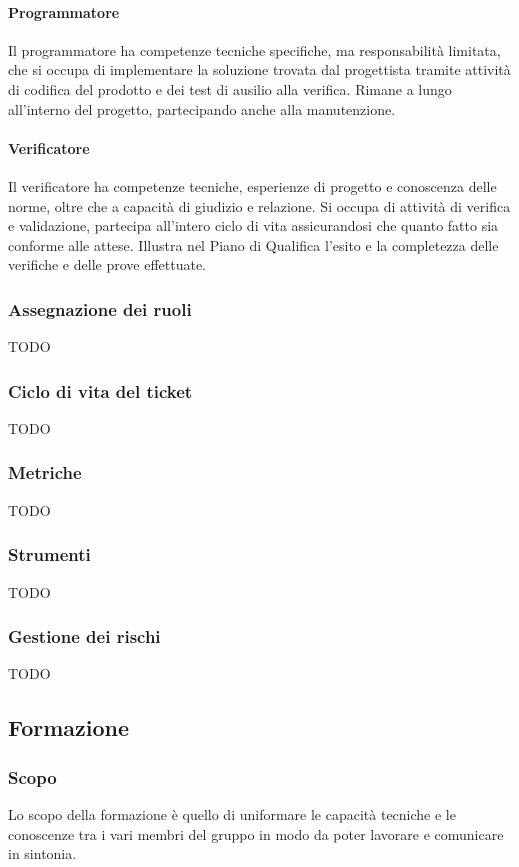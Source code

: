 \documentclass[../norme-di-progetto.tex]{subfiles}
\begin{document}
        \paragraph{Programmatore}
        Il programmatore ha competenze tecniche specifiche, ma responsabilità limitata, che si occupa di implementare la soluzione trovata dal progettista tramite attività di codifica del prodotto e dei test di ausilio alla verifica. Rimane a lungo all'interno del progetto, partecipando anche alla manutenzione.
        \paragraph{Verificatore}
        Il verificatore ha competenze tecniche, esperienze di progetto e conoscenza delle norme, oltre che a capacità di giudizio e relazione. Si occupa di attività di verifica e validazione, partecipa all'intero ciclo di vita assicurandosi che quanto fatto sia conforme alle attese. Illustra nel Piano di Qualifica l'esito e la completezza delle verifiche e delle prove effettuate.
    \subsubsection{Assegnazione dei ruoli}
    TODO
    \subsubsection{Ciclo di vita del ticket}
    TODO
    \subsubsection{Metriche}
    TODO
    \subsubsection{Strumenti}
    TODO
    \subsubsection{Gestione dei rischi}
    TODO

\subsection{Formazione}
    \subsubsection{Scopo}
    Lo scopo della formazione è quello di uniformare le capacità tecniche e le conoscenze tra i vari membri del gruppo in modo da poter lavorare e comunicare in sintonia.
\end{document}
